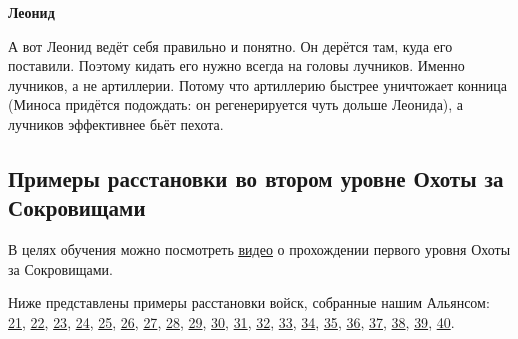 \textbf{Леонид}

А вот Леонид ведёт себя правильно и понятно.
Он дерётся там, куда его поставили.
Поэтому кидать его нужно всегда на головы лучников.
Именно лучников, а не артиллерии.
Потому что артиллерию быстрее уничтожает конница (Миноса придётся подождать: он регенерируется чуть дольше Леонида),
а лучников эффективнее бьёт пехота.

\subsection{Примеры расстановки во втором уровне Охоты за Сокровищами}

В целях обучения можно посмотреть
\underline{\href{https://youtu.be/JD1PWm27lHg}{видео}}
о прохождении первого уровня Охоты за Сокровищами.

Ниже представлены примеры расстановки войск, собранные нашим Альянсом:
\hyperlink{fight21}{21}, 
\hyperlink{fight22}{22}, 
\hyperlink{fight23}{23}, 
\hyperlink{fight24}{24}, 
\hyperlink{fight25}{25}, 
\hyperlink{fight26}{26}, 
\hyperlink{fight27}{27}, 
\hyperlink{fight28}{28}, 
\hyperlink{fight29}{29}, 
\hyperlink{fight30}{30}, 
\hyperlink{fight31}{31}, 
\hyperlink{fight32}{32}, 
\hyperlink{fight33}{33}, 
\hyperlink{fight34}{34}, 
\hyperlink{fight35}{35}, 
\hyperlink{fight36}{36}, 
\hyperlink{fight37}{37}, 
\hyperlink{fight38}{38}, 
\hyperlink{fight39}{39}, 
\hyperlink{fight40}{40}.

